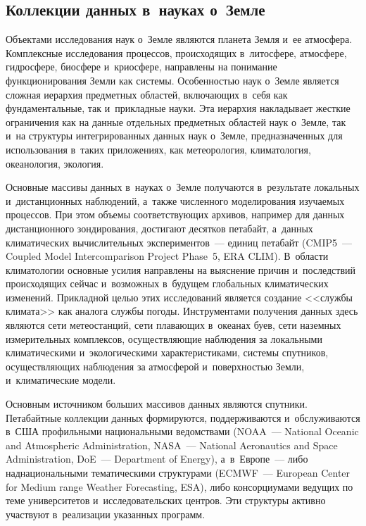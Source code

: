 \begin{multicols}{2}
\vspace*{-4pt}

\section{Коллекции данных в~науках о~Земле}

\vspace*{-2pt}

  Объектами исследования наук о~Земле являются планета Земля и~ее атмосфера. 
Комплексные исследования процессов, происходящих в~литосфере, атмосфере, 
гидросфере, биосфере и~криосфере, направлены на понимание функционирования Земли 
как системы. Особенностью наук о~Земле является сложная иерархия предметных 
областей, включающих в~себя как фундаментальные, так и~прикладные науки. Эта 
иерархия накладывает жесткие ограничения как на данные отдельных предметных 
областей наук о~Земле, так и~на структуры интегрированных данных наук о~Земле, 
предназначенных для использования в~таких приложениях, как метеорология, 
климатология, океанология, экология. 
  
  Основные массивы данных в~науках о~Земле получаются в~результате локальных 
и~дистанционных наблюдений, а~также численного моделирования изучаемых процессов. 
При этом объемы соответствующих архивов, например для данных дистанционного 
зондирования, достигают десятков петабайт, а~данных климатических вычислительных 
экспериментов~--- единиц петабайт (CMIP5~--- Coupled Model Intercomparison Project Phase~5, 
ERA CLIM). В~об\-ласти климатологии основные 
усилия направлены на выяснение причин и~последствий происходящих сейчас 
и~возможных в~будущем глобальных климатических изменений. Прикладной целью этих 
исследований является создание <<службы климата>> как аналога службы погоды. 
Инструментами получения данных здесь являются сети метеостанций, сети плавающих 
в~океанах буев, сети наземных измерительных комплексов, осуществляющие наблюдения 
за локальными климатическими и~экологическими характеристиками, системы спутников, 
осуществляющих наблюдения за атмосферой и~поверхностью Земли, и~климатические 
модели.
  
  Основным источником больших массивов данных являются спутники. Петабайтные 
коллекции данных формируются, поддерживаются и~обслуживаются в~США 
профильными национальными ведомствами (NOAA~--- National Oceanic and Atmospheric
Administration, NASA~--- National Aeronautics and Space Administration, 
DoE~--- Department of Energy), а~в~Европе~--- либо 
наднациональными тематическими структурами (ECMWF~--- European Center for
Medium range Weather Forecasting, ESA), либо консорциумами 
ведущих по теме университетов и~исследовательских центров. Эти структуры активно 
участвуют в~реализации указанных программ.


\end{multicols}
